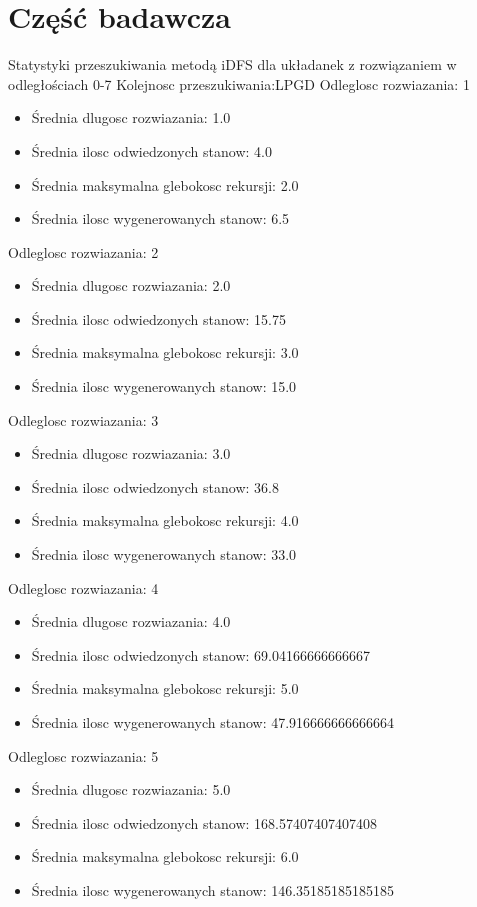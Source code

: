 \documentclass{classrep}
\begin{document}
		\section{Część badawcza}
		Statystyki przeszukiwania metodą iDFS dla układanek z rozwiązaniem w odległościach 0-7
		\newline
		Kolejnosc przeszukiwania:LPGD
		Odleglosc rozwiazania: 1
		\begin{itemize}
			\item Średnia dlugosc rozwiazania: 1.0
			\item Średnia ilosc odwiedzonych stanow: 4.0
			\item Średnia maksymalna glebokosc rekursji: 2.0
			\item Średnia ilosc wygenerowanych stanow: 6.5
		\end{itemize}
		Odleglosc rozwiazania: 2
		\begin{itemize}
			\item Średnia dlugosc rozwiazania: 2.0
			\item Średnia ilosc odwiedzonych stanow: 15.75
			\item Średnia maksymalna glebokosc rekursji: 3.0
			\item Średnia ilosc wygenerowanych stanow: 15.0
		\end{itemize}
		Odleglosc rozwiazania: 3
		\begin{itemize}
			\item Średnia dlugosc rozwiazania: 3.0
			\item Średnia ilosc odwiedzonych stanow: 36.8
			\item Średnia maksymalna glebokosc rekursji: 4.0
			\item Średnia ilosc wygenerowanych stanow: 33.0
		\end{itemize}
		Odleglosc rozwiazania: 4
		\begin{itemize}
			\item Średnia dlugosc rozwiazania: 4.0
			\item Średnia ilosc odwiedzonych stanow: 69.04166666666667
			\item Średnia maksymalna glebokosc rekursji: 5.0
			\item Średnia ilosc wygenerowanych stanow: 47.916666666666664
		\end{itemize}
		Odleglosc rozwiazania: 5
		\begin{itemize}
			\item Średnia dlugosc rozwiazania: 5.0
			\item Średnia ilosc odwiedzonych stanow: 168.57407407407408
			\item Średnia maksymalna glebokosc rekursji: 6.0
			\item Średnia ilosc wygenerowanych stanow: 146.35185185185185
		\end{itemize}
\end{document}
